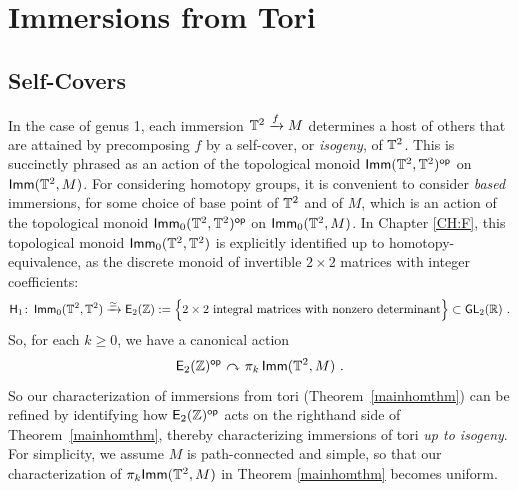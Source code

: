 \section{Immersions from Tori}

 




\subsection{Self-Covers}
In the case of genus 1, 
each immersion $\mathbb T^2\xrightarrow{f} M$ determines a host of others that are attained by precomposing $f$ by a self-cover, or \emph{isogeny}, of $\mathbb T^2$.
This is succinctly phrased as an action of the topological monoid $\operatorname{\sf Imm}(\mathbb T^2,\mathbb T^2)^{\operatorname{\mathsf{op}}}$ on $\operatorname{\sf Imm}(\mathbb T^2,M)$.
For considering homotopy groups, it is convenient to consider \emph{based} immersions, for some choice of base point of $\mathbb T^2$ and of $M$, which is an action of the topological monoid $\operatorname{\sf Imm}_0(\mathbb T^2,\mathbb T^2)^{\operatorname{\mathsf{op}}}$ on $\operatorname{\sf Imm}_0(\mathbb T^2,M)$.  
In Chapter \ref{CH:F}, this topological monoid $\operatorname{\sf Imm}_0(\mathbb T^2,\mathbb T^2)$ is explicitly identified up to homotopy-equivalence, as the discrete monoid of invertible $2\times 2$ matrices with integer coefficients:
\[
\mathsf H_1
\colon
\operatorname{\sf Imm}_0(\mathbb T^2,\mathbb T^2)
\xrightarrow{\simeq}
\mathsf E_2(\mathbb Z)
:=
\Bigl\{2 \times 2 \text{ integral matrices with nonzero determinant}
\Bigr\}
\subset
\operatorname{\sf GL}_2(\mathbb R)
~.
\]
So, for each $k\geq 0$, we have a canonical action
\begin{equation}
\label{e5uni}
\mathsf E_2(\mathbb Z)^{\operatorname{\mathsf{op}}}
~{\curvearrowright}~
\pi_k \operatorname{\sf Imm}(\mathbb T^2,M)
~.
\end{equation}
So our characterization of immersions from tori (Theorem~\ref{mainhomthm}) can be refined by identifying how $\mathsf E_2(\mathbb Z)^{\operatorname{\mathsf{op}}}$ acts on the righthand side of Theorem~\ref{mainhomthm}, thereby characterizing immersions of tori \emph{up to isogeny}.
For simplicity, we assume $M$ is path-connected and simple, so that our characterization of $\pi_{k}{\sf Imm}(\mathbb T^{2}, M)$ in Theorem \ref{mainhomthm} becomes uniform.




